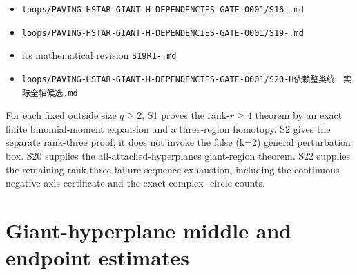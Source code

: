 \documentclass[10pt]{article}
\begin{document}
\begin{itemize}
\item \texttt{loops/\allowbreak{}PAVING-\allowbreak{}HSTAR-\allowbreak{}GIANT-\allowbreak{}H-\allowbreak{}DEPENDENCIES-\allowbreak{}GATE-\allowbreak{}0001/\allowbreak{}S16-.\allowbreak{}md}
\item \texttt{loops/\allowbreak{}PAVING-\allowbreak{}HSTAR-\allowbreak{}GIANT-\allowbreak{}H-\allowbreak{}DEPENDENCIES-\allowbreak{}GATE-\allowbreak{}0001/\allowbreak{}S19-.\allowbreak{}md}
\item its mathematical revision \texttt{S19R1-.\allowbreak{}md}
\item \texttt{loops/\allowbreak{}PAVING-\allowbreak{}HSTAR-\allowbreak{}GIANT-\allowbreak{}H-\allowbreak{}DEPENDENCIES-\allowbreak{}GATE-\allowbreak{}0001/\allowbreak{}S20-H{\cjkfont 依\allowbreak{}赖\allowbreak{}整\allowbreak{}类\allowbreak{}统\allowbreak{}一\allowbreak{}实\allowbreak{}际\allowbreak{}全\allowbreak{}轴\allowbreak{}候\allowbreak{}选}.\allowbreak{}md}
\end{itemize}

For each fixed outside size $q\ge2$, S1 proves the rank-$r\ge4$ theorem by
an exact finite binomial-moment expansion and a three-region homotopy.  S2 gives
the separate rank-three proof; it does not invoke the false (k=2) general
perturbation box.  S20 supplies the all-attached-hyperplanes giant-region
theorem.  S22 supplies the remaining rank-three failure-sequence exhaustion,
including the continuous negative-axis certificate and the exact complex-
circle counts.

\section{Giant-hyperplane middle and endpoint estimates}
\end{document}
